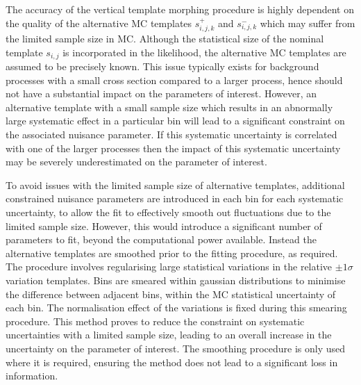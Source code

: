 The accuracy of the vertical template morphing procedure is highly dependent on the quality of the alternative MC templates $s_{i,j,k}^+$ and $s_{i,j,k}^-$ which may suffer from the limited sample size in MC. Although the statistical size of the nominal template $s_{i,j}$ is incorporated in the likelihood, the alternative MC templates are assumed to be precisely known. This issue typically exists for background processes with a small cross section compared to a larger process, hence should not have a substantial impact on the parameters of interest. However, an alternative template with a small sample size which results in an abnormally large systematic effect in a particular bin will lead to a significant constraint on the associated nuisance parameter. If this systematic uncertainty is correlated with one of the larger processes then the impact of this systematic uncertainty may be severely underestimated on the parameter of interest.

To avoid issues with the limited sample size of alternative templates, additional constrained nuisance parameters are introduced in each bin for each systematic uncertainty, to allow the fit to effectively smooth out fluctuations due to the limited sample size. However, this would introduce a significant number of parameters to fit, beyond the computational power available. Instead the alternative templates are smoothed prior to the fitting procedure, as required. The procedure involves regularising large statistical variations in the relative $\pm 1\sigma$ variation templates. Bins are smeared within gaussian distributions to minimise the difference between adjacent bins, within the MC statistical uncertainty of each bin. The normalisation effect of the variations is fixed during this smearing procedure. This method proves to reduce the constraint on systematic uncertainties with a limited sample size, leading to an overall increase in the uncertainty on the parameter of interest. The smoothing procedure is only used where it is required, ensuring the method does not lead to a significant loss in information.
